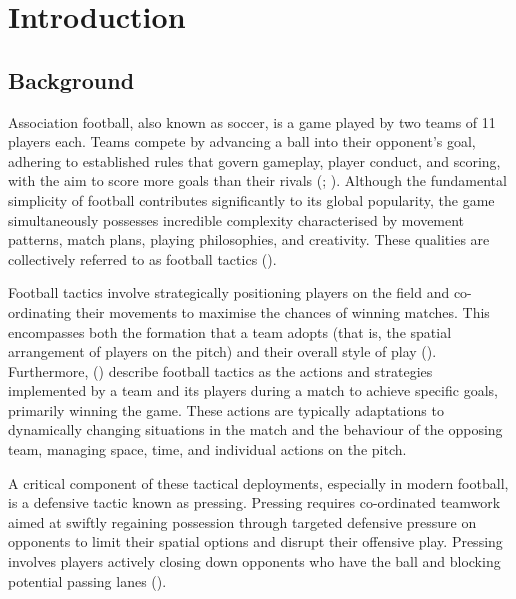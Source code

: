 \documentclass[12pt]{article}
\begin{document}
\tableofcontents
\pagebreak

\section{Introduction}


\subsection{Background}

Association football, also known as soccer, is a game played by two teams of 11 players each. Teams compete by advancing a ball into their opponent's goal, adhering to established rules that govern gameplay, player conduct, and scoring, with the aim to score more goals than their rivals (\cite{memmert_data_2018}; \cite{sumpter_soccermatics_2016}). Although the fundamental simplicity of football contributes significantly to its global popularity, the game simultaneously possesses incredible complexity characterised by movement patterns, match plans, playing philosophies, and creativity. These qualities are collectively referred to as football tactics (\cite{memmert_data_2018}).

Football tactics involve strategically positioning players on the field and co-ordinating their movements to maximise the chances of winning matches. This encompasses both the formation that a team adopts (that is, the spatial arrangement of players on the pitch) and their overall style of play (\cite{wilson_inverting_2010}). Furthermore, (\cite{rein_big_2016}) describe football tactics as the actions and strategies implemented by a team and its players during a match to achieve specific goals, primarily winning the game. These actions are typically adaptations to dynamically changing situations in the match and the behaviour of the opposing team, managing space, time, and individual actions on the pitch.

A critical component of these tactical deployments, especially in modern football, is a defensive tactic known as pressing. Pressing requires co-ordinated teamwork aimed at swiftly regaining possession through targeted defensive pressure on opponents to limit their spatial options and disrupt their offensive play. Pressing involves players actively closing down opponents who have the ball and blocking potential passing lanes (\cite{borbely_all_2018}).
\end{document}
